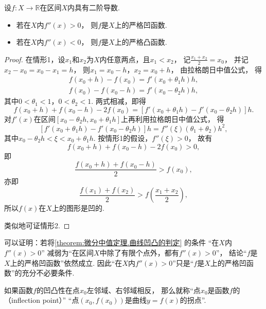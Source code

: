 \begin{theorem}[曲线凹凸的判定]\label{theorem:微分中值定理.曲线凹凸的判定}
设\(f\colon X\to\mathbb{R}\)在区间\(X\)内具有二阶导数.
\begin{itemize}
	\item 若在\(X\)内\(f''(x)>0\)，
	则\(f\)是\(X\)上的严格凹函数.
	\item 若在\(X\)内\(f''(x)<0\)，
	则\(f\)是\(X\)上的严格凸函数.
\end{itemize}
\begin{proof}
在情形1，设\(x_1\)和\(x_2\)为\(X\)内任意两点，且\(x_1 < x_2\)，
记\(\frac{x_1 + x_2}{2} = x_0\)，
并记\(x_2 - x_0 = x_0 - x_1 = h\)，
则\(x_1 = x_0 - h\)，\(x_2 = x_0 + h\)，
由拉格朗日中值公式，
得\begin{gather*}
	f(x_0 + h) - f(x_0) = f'(x_0 + \theta_1 h) h, \\
	f(x_0) - f(x_0 - h) = f'(x_0 - \theta_2 h) h,
\end{gather*}
其中\(0 < \theta_1 < 1\)，\(0 < \theta_2 < 1\).
两式相减，即得\[
	f(x_0 + h) + f(x_0 - h) - 2 f(x_0)
	= [ f'(x_0 + \theta_1 h) - f'(x_0 - \theta_2 h) ] h.
\]
对\(f'(x)\)在区间\([x_0 - \theta_2 h,x_0 + \theta_1 h]\)上再利用拉格朗日中值公式，
得\[
	[ f'(x_0 + \theta_1 h) - f'(x_0 - \theta_2 h) ] h
	= f''(\xi) (\theta_1 + \theta_2) h^2,
\]
其中\(x_0 - \theta_2 h < \xi < x_0 + \theta_1 h\).
按情形1的假设，\(f''(\xi) > 0\)，
故有\[
	f(x_0 + h) + f(x_0 - h) - 2 f(x_0) > 0,
\]
即\[
	\frac{f(x_0 + h) + f(x_0 - h)}{2} > f(x_0),
\]
亦即\[
	\frac{f(x_1) + f(x_2)}{2} > f\left(\frac{x_1 + x_2}{2}\right),
\]
所以\(f(x)\)在\(X\)上的图形是凹的.

类似地可证情形2.
\end{proof}
\end{theorem}
\begin{remark}
可以证明：若将\cref{theorem:微分中值定理.曲线凹凸的判定} 的条件
“在\(X\)内\(f''(x)>0\)”
减弱为“在区间\(X\)中除了有限个点外，都有\(f''(x)>0\)”，
结论“\(f\)是\(X\)上的严格凹函数”依然成立.
因此“在\(X\)内\(f''(x)>0\)”只是“\(f\)是\(X\)上的严格凹函数”的充分不必要条件.
\end{remark}

\begin{definition}
如果函数\(f\)的凹凸性在点\(x_0\)左邻域、右邻域相反，
那么就称“点\(x_0\)是函数\(f\)的（inflection point）”
“点\((x_0,f(x_0))\)是曲线\(y=f(x)\)的拐点”.
\end{definition}

